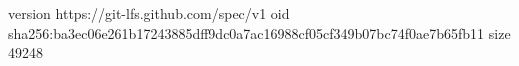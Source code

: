 version https://git-lfs.github.com/spec/v1
oid sha256:ba3ec06e261b17243885dff9dc0a7ac16988cf05cf349b07bc74f0ae7b65fb11
size 49248
